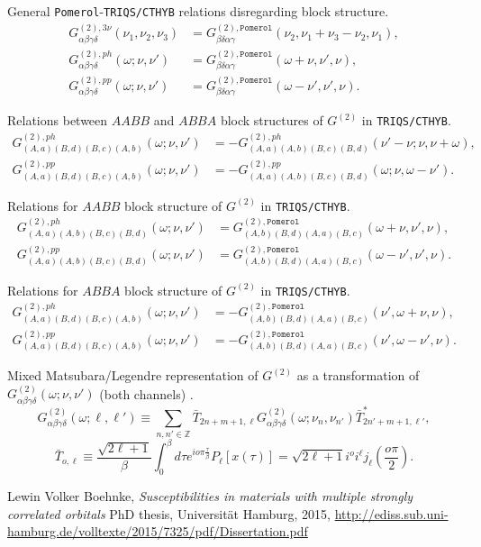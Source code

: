 \documentclass[a4paper,12pt]{article}
\renewcommand{\t}{\ensuremath{\tau}}
\newcommand{\w}{\ensuremath{\omega}}
\newcommand{\n}{\ensuremath{\nu}}
\newcommand{\pom}{\ensuremath{\mathtt{Pomerol}}}
\begin{document}
General \texttt{Pomerol}-\texttt{TRIQS/CTHYB} relations disregarding block
structure.
\begin{align}
	G^{(2),3\nu}_{\alpha\beta\gamma\delta}(\nu_1,\nu_2,\nu_3) &=
	G^{(2),\pom}_{\beta\delta\alpha\gamma}(\nu_2,\nu_1+\nu_3-\nu_2,\nu_1),\\
	G^{(2),ph}_{\alpha\beta\gamma\delta}(\w;\n,\n') &=
	G^{(2),\pom}_{\beta\delta\alpha\gamma}(\w+\n,\n',\n),\\
	G^{(2),pp}_{\alpha\beta\gamma\delta}(\w;\n,\n') &=
	G^{(2),\pom}_{\beta\delta\alpha\gamma}(\w-\n',\n',\n).
\end{align}

Relations between $AABB$ and $ABBA$ block structures of $G^{(2)}$  in
\texttt{TRIQS/CTHYB}.
\begin{align}
G^{(2),ph}_{(A,a)(B,d)(B,c)(A,b)}(\w;\n,\n') &= -
G^{(2),ph}_{(A,a)(A,b)(B,c)(B,d)}(\n'-\n;\n,\n+\w),\\
G^{(2),pp}_{(A,a)(B,d)(B,c)(A,b)}(\w;\n,\n') &= -
G^{(2),pp}_{(A,a)(A,b)(B,c)(B,d)}(\w;\n,\w-\n').
\end{align}

Relations for $AABB$ block structure of $G^{(2)}$ in \texttt{TRIQS/CTHYB}.
\begin{align}
	G^{(2),ph}_{(A,a)(A,b)(B,c)(B,d)}(\w;\n,\n') &=
	G^{(2),\pom}_{(A,b)(B,d)(A,a)(B,c)}(\w+\n,\n',\n),\\
	G^{(2),pp}_{(A,a)(A,b)(B,c)(B,d)}(\w;\n,\n') &=
	G^{(2),\pom}_{(A,b)(B,d)(A,a)(B,c)}(\w-\n',\n',\n).
\end{align}

Relations for $ABBA$ block structure of $G^{(2)}$ in \texttt{TRIQS/CTHYB}.
\begin{align}
	G^{(2),ph}_{(A,a)(B,d)(B,c)(A,b)}(\w;\n,\n') &= -
	G^{(2),\pom}_{(A,b)(B,d)(A,a)(B,c)}(\n',\w+\n,\n),\\
	G^{(2),pp}_{(A,a)(B,d)(B,c)(A,b)}(\w;\n,\n') &= -
	G^{(2),\pom}_{(A,b)(B,d)(A,a)(B,c)}(\n',\w-\n',\n).
\end{align}

Mixed Matsubara/Legendre representation of $G^{(2)}$ as a transformation of
$G^{(2)}_{\alpha\beta\gamma\delta}(\w;\nu,\nu')$ (both channels)
\cite{LewinThesis}.
\begin{equation}\label{legendre_transform}
	G^{(2)}_{\alpha\beta\gamma\delta}(\w;\ell,\ell') \equiv
	\sum_{n,n'\in\mathbb{Z}}
	\bar T_{2n+m+1,\ell}
	G^{(2)}_{\alpha\beta\gamma\delta}(\w;\nu_n,\nu_{n'})
	\bar T^*_{2n'+m+1,\ell'},
\end{equation}
\begin{equation}
	\bar T_{o,\ell} \equiv \frac{\sqrt{2\ell+1}}{\beta}
	\int_0^\beta d\t e^{io\pi\frac{\t}{\beta}} P_\ell[x(\t)] =
	\sqrt{2\ell+1}i^o i^\ell j_\ell\left(\frac{o\pi}{2}\right).
\end{equation}



\begin{thebibliography}{9}
	Lewin Volker Boehnke,
	\emph{Susceptibilities in materials with multiple strongly correlated 
	orbitals}
	PhD thesis, Universit\"at Hamburg, 2015,
	\url{http://ediss.sub.uni-hamburg.de/volltexte/2015/7325/pdf/Dissertation.pdf}
\end{thebibliography}
\end{document}
